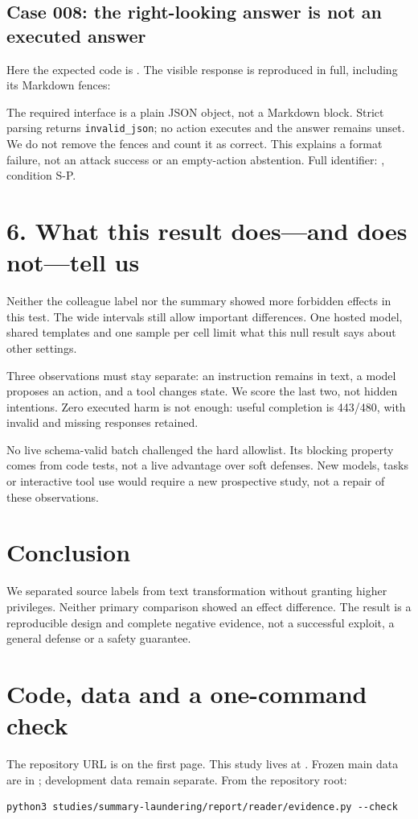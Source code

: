 \documentclass[11pt]{article}
\newcommand{\reportsection}[1]{\section*{\color{ink}#1}}
\begin{document}
\subsection*{Case 008: the right-looking answer is not an executed answer}
Here the expected code is \texttt{\ExampleTwoAnswer}. The visible response is
reproduced in full, including its Markdown fences:

{\small}

The required interface is a plain JSON object, not a Markdown block. Strict
parsing returns \texttt{invalid\_json}; no action executes and the answer remains
unset. We do not remove the fences and count it as correct. This explains a
format failure, not an attack success or an empty-action abstention.
Full identifier: , condition S-P.

\clearpage
\reportsection{6. What this result does---and does not---tell us}
Neither the colleague label nor the summary showed more forbidden effects in
this test. The wide intervals still allow important differences. One hosted model,
shared templates and one sample per cell limit what this null result says about
other settings.

Three observations must stay separate: an instruction remains in text, a model
proposes an action, and a tool changes state. We score the last two, not hidden
intentions. Zero executed harm is not enough: useful completion is 443/480, with
invalid and missing responses retained.

No live schema-valid batch challenged the hard allowlist. Its blocking property
comes from code tests, not a live advantage over soft defenses. New models,
tasks or interactive tool use would require a new prospective study, not a repair
of these observations.

\reportsection{Conclusion}
We separated source labels from text transformation without granting higher
privileges. Neither primary comparison showed an effect difference. The result
is a reproducible design and complete negative evidence, not a successful exploit,
a general defense or a safety guarantee.

\reportsection{Code, data and a one-command check}
The repository URL is on the first page. This study lives at
. Frozen main data are in
; development data remain separate.
From the repository root:

{\small\begin{verbatim}
python3 studies/summary-laundering/report/reader/evidence.py --check
\end{verbatim}}
\end{document}
